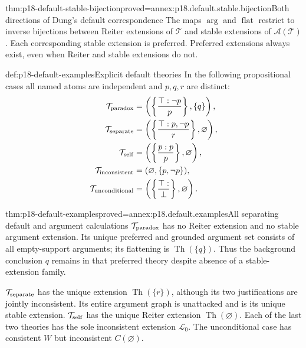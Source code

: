 \begin{hbtheorem}{thm:p18-default-stable-bijection}{proved=annex:p18.default.stable.bijection}{Both directions of Dung's default correspondence}
The maps \(\operatorname{arg}\) and
\(\operatorname{flat}\) restrict to inverse
bijections between Reiter extensions of
\(\mathcal T\) and stable extensions of
\(\mathcal A(\mathcal T)\).
Each corresponding stable extension is
preferred. Preferred extensions always
exist, even when Reiter and stable
extensions do not.
\end{hbtheorem}

\begin{hbdefinition}{def:p18-default-examples}{Explicit default theories}
In the following propositional cases all
named atoms are independent and \(p,q,r\)
are distinct:
\[
\begin{aligned}
 \mathcal T_{\rm paradox}
   &=\left(\left\{\frac{\top:\neg p}{p}\right\},\{q\}\right),\\
 \mathcal T_{\rm separate}
   &=\left(\left\{\frac{\top:p,\neg p}{r}\right\},\varnothing\right),\\
 \mathcal T_{\rm self}
   &=\left(\left\{\frac{p:p}{p}\right\},\varnothing\right),\\
 \mathcal T_{\rm inconsistent}
   &=(\varnothing,\{p,\neg p\}),\\
 \mathcal T_{\rm unconditional}
   &=\left(\left\{\frac{\top:}{\bot}\right\},\varnothing\right).
\end{aligned}
\]
\end{hbdefinition}

\begin{hbtheorem}{thm:p18-default-examples}{proved=annex:p18.default.examples}{All separating default and argument calculations}
\(\mathcal T_{\rm paradox}\) has no Reiter
extension and no stable argument extension.
Its unique preferred and grounded argument
set consists of all empty-support arguments;
its flattening is \(\operatorname{Th}(\{q\})\).
Thus the background conclusion \(q\) remains
in that preferred theory despite absence
of a stable-extension family.

\(\mathcal T_{\rm separate}\) has the unique
extension \(\operatorname{Th}(\{r\})\), although
its two justifications are jointly inconsistent.
Its entire argument graph is unattacked
and is its unique stable extension.
\(\mathcal T_{\rm self}\) has the unique
Reiter extension \(\operatorname{Th}(\varnothing)\).
Each of the last two theories has the
sole inconsistent extension \(\mathcal L_0\).
The unconditional case has consistent
\(W\) but inconsistent \(C(\varnothing)\).
\end{hbtheorem}

